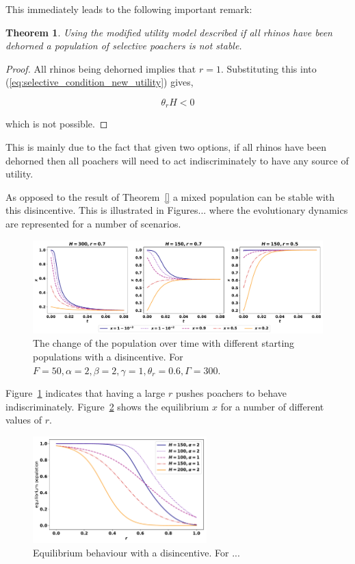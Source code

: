 \documentclass[10pt]{article}
\newtheorem{theorem}{Theorem}
\begin{document}
This immediately leads to the following important remark:

\begin{theorem}
Using the modified utility model described 
if all rhinos have been dehorned a population of selective poachers is not
stable.
\end{theorem}

\begin{proof}
All rhinos being dehorned implies that \(r=1\). Substituting this into 
(\ref{eq:selective_condition_new_utility}) gives,

\begin{equation}
    \theta_r H < 0
\end{equation}

which is not possible.
\end{proof}

This is mainly due to the fact that given two options, if all rhinos have been
dehorned then all poachers will need to act indiscriminately to have any source
of utility.

As opposed to the result of Theorem~\ref{} a mixed population can be stable 
with this disincentive. This is illustrated in Figures... where the evolutionary 
dynamics are represented for a number of scenarios.

\begin{figure}[!htbp]
    \includegraphics[width=\textwidth]{images/ESS-new-utility.pdf}
    \caption{The change of the population over 
    time with different starting populations with a disincentive. For \(F=50, \alpha=2,
    \beta=2, \gamma=1, \theta_r=0.6, \Gamma=300\).}
    \label{fig:ess-new-utility}
\end{figure}

Figure~\ref{fig:ess-new-utility} indicates that having a large \(r\) pushes poachers
to behave indiscriminately. Figure~\ref{fig:equilibrium-over-r-tilde-u} shows the
equilibrium \(x\) for a number of different values of \(r\).

\begin{figure}[!htbp]
\centering
    \includegraphics[width=0.6\textwidth]{images/new-utility-over_r.pdf}
    \caption{Equilibrium behaviour with a disincentive. For ...}
    \label{fig:equilibrium-over-r-tilde-u}
\end{figure}
\end{document}
